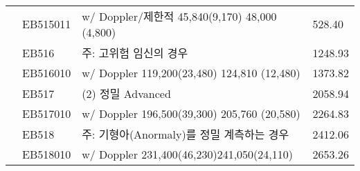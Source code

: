 \begin{table}
\begin{threeparttable}
\begin{tabu}{X|X|X[5.8]|X}
	   & EB515011 & \hspace{.5cm}w/ Doppler/제한적 45,840(9,170) 48,000 (4,800) &  528.40 \\ 
	   & EB516 & \hspace{.5cm}\textsf{주: 고위험 임신의 경우 } & 1248.93 \\
	   & EB516010 & \hspace{1cm}w/ Doppler 119,200(23,480) 124,810 (12,480) & 1373.82\\
	   & EB517 & (2) 정밀 Advanced  & 2058.94 \\
	   & EB517010 &  \hspace{.5cm}w/ Doppler 196,500(39,300)  205,760 (20,580) & 2264.83\\
	   & EB518 & \hspace{.5cm}\textsf{주: 기형아(Anormaly)를 정밀 계측하는 경우 } & 2412.06 \\
	   & EB518010 &  \hspace{1cm}w/ Doppler 231,400(46,230)241,050(24,110) & 2653.26\\

\end{tabu}
\end{threeparttable}
\end{table}
